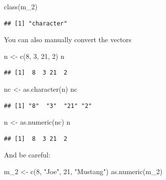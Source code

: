 \documentclass[
]{book}
\newenvironment{Shaded}{\begin{snugshade}}{\end{snugshade}}
\newcommand{\DecValTok}[1]{\textcolor[rgb]{0.00,0.00,0.81}{#1}}
\newcommand{\FunctionTok}[1]{\textcolor[rgb]{0.00,0.00,0.00}{#1}}
\newcommand{\NormalTok}[1]{#1}
\newcommand{\OtherTok}[1]{\textcolor[rgb]{0.56,0.35,0.01}{#1}}
\newcommand{\StringTok}[1]{\textcolor[rgb]{0.31,0.60,0.02}{#1}}
\theoremstyle{definition}
\theoremstyle{definition}
\theoremstyle{definition}
\theoremstyle{definition}
\theoremstyle{remark}
\begin{document}
\begin{Shaded}
\begin{Highlighting}[]
\FunctionTok{class}\NormalTok{(m\_2)}
\end{Highlighting}
\end{Shaded}

\begin{verbatim}
## [1] "character"
\end{verbatim}

You can also manually convert the vectors

\begin{Shaded}
\begin{Highlighting}[]
\NormalTok{n }\OtherTok{\textless{}{-}} \FunctionTok{c}\NormalTok{(}\DecValTok{8}\NormalTok{, }\DecValTok{3}\NormalTok{, }\DecValTok{21}\NormalTok{, }\DecValTok{2}\NormalTok{)}
\NormalTok{n}
\end{Highlighting}
\end{Shaded}

\begin{verbatim}
## [1]  8  3 21  2
\end{verbatim}

\begin{Shaded}
\begin{Highlighting}[]
\NormalTok{nc }\OtherTok{\textless{}{-}} \FunctionTok{as.character}\NormalTok{(n)}
\NormalTok{nc}
\end{Highlighting}
\end{Shaded}

\begin{verbatim}
## [1] "8"  "3"  "21" "2"
\end{verbatim}

\begin{Shaded}
\begin{Highlighting}[]
\NormalTok{n }\OtherTok{\textless{}{-}} \FunctionTok{as.numeric}\NormalTok{(nc)}
\NormalTok{n}
\end{Highlighting}
\end{Shaded}

\begin{verbatim}
## [1]  8  3 21  2
\end{verbatim}

And be careful:

\begin{Shaded}
\begin{Highlighting}[]
\NormalTok{m\_2 }\OtherTok{\textless{}{-}} \FunctionTok{c}\NormalTok{(}\DecValTok{8}\NormalTok{, }\StringTok{"Joe"}\NormalTok{, }\DecValTok{21}\NormalTok{, }\StringTok{"Mustang"}\NormalTok{)}
\FunctionTok{as.numeric}\NormalTok{(m\_2)}
\end{Highlighting}
\end{Shaded}
\end{document}
